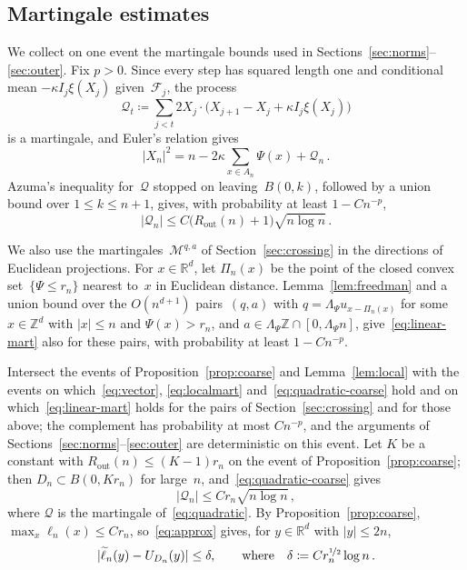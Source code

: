 \documentclass[11pt]{amsart}
\theoremstyle{plain}
\theoremstyle{definition}
\newcommand{\Z}{\mathbb Z}
\newcommand{\R}{\mathbb R}
\newcommand{\drift}{\kappa}
\newcommand{\gauge}{\Psi}
\newcommand{\nf}{\nicefrac}
\newcommand{\Rout}{R_{\mathrm{out}}}
\numberwithin{equation}{section}
\begin{document}
\subsection{Martingale estimates}\label{sec:norm-event}

We collect on one event the martingale bounds used in Sections~\ref{sec:norms}--\ref{sec:outer}. Fix $p>0$. Since every step has squared length one and conditional mean $-\drift I_j\xi(X_j)$ given~$\mathcal F_j$, the process
\begin{equation*}
\mathcal Q_t\coloneqq\sum_{j<t}2X_j\cdot\bigl(X_{j+1}-X_j+\drift I_j\xi(X_j)\bigr)
\end{equation*}
is a martingale, and Euler's relation gives
\begin{equation}\label{eq:quadratic}
|X_n|^2=n-2\drift\sum_{x\in A_n}\gauge(x)+\mathcal Q_n\, .
\end{equation}
Azuma's inequality for~$\mathcal Q$ stopped on leaving~$B(0,k)$, followed by a union bound over $1\leq k\leq n+1$, gives, with probability at least $1-Cn^{-p}$,
\begin{equation}\label{eq:quadratic-coarse}
|\mathcal Q_n|\leq C\bigl(\Rout(n)+1\bigr)\sqrt{n\log n}\, .
\end{equation}

We also use the martingales~$\mathcal M^{q,a}$ of Section~\ref{sec:crossing} in the directions of Euclidean projections. For $x\in\R^d$, let $\Pi_n(x)$ be the point of the closed convex set~$\{\gauge\leq r_n\}$ nearest to~$x$ in Euclidean distance. Lemma~\ref{lem:freedman} and a union bound over the $O(n^{d+1})$ pairs~$(q,a)$ with $q=\Lambda_\gauge u_{x-\Pi_n(x)}$ for some $x\in\Z^d$ with $|x|\leq n$ and $\gauge(x)>r_n$, and $a\in\Lambda_\gauge\Z\cap[0,\Lambda_\gauge n]$, give~\eqref{eq:linear-mart} also for these pairs, with probability at least $1-Cn^{-p}$.

Intersect the events of Proposition~\ref{prop:coarse} and Lemma~\ref{lem:local} with the events on which~\eqref{eq:vector}, \eqref{eq:localmart} and~\eqref{eq:quadratic-coarse} hold and on which~\eqref{eq:linear-mart} holds for the pairs of Section~\ref{sec:crossing} and for those above; the complement has probability at most $Cn^{-p}$, and the arguments of Sections~\ref{sec:norms}--\ref{sec:outer} are deterministic on this event. Let $K$ be a constant with $\Rout(n)\leq(K-1)r_n$ on the event of Proposition~\ref{prop:coarse}; then $D_n\subset B(0,Kr_n)$ for large~$n$, and~\eqref{eq:quadratic-coarse} gives
\begin{equation}\label{eq:quadraticerror}
|\mathcal Q_n|\leq Cr_n\sqrt{n\log n}\, ,
\end{equation}
where $\mathcal Q$ is the martingale of~\eqref{eq:quadratic}. By Proposition~\ref{prop:coarse}, $\max_x\ell_n(x)\leq Cr_n$, so~\eqref{eq:approx} gives, for $y\in\R^d$ with $|y|\leq2n$,
\begin{equation}\label{eq:norm-approx}
|\widetilde\ell_n(y)-U_{D_n}(y)|\leq\delta,\qquad\text{where}\quad\delta\coloneqq Cr_n^{\nf12}\log n\, .
\end{equation}
\end{document}
